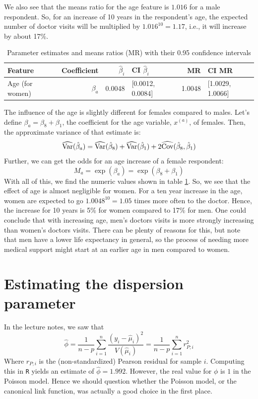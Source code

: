 \documentclass[a4paper,11pt]{article}
\begin{document}
We also see that the means ratio for the age feature is $1.016$ for a male respondent. So, for an increase of 10 years in the respondent's age, the expected number of doctor visits will be multiplied by $1.016^{10} = 1.17$, i.e., it will increase by about 17\%. 

\begin{table}[h]
\centering
\begin{tabular}{|l|r|r|l|r|l|}
\hline
Feature & Coefficient & $\hat{\beta}_i$ & CI $\hat{\beta}_i$ & MR & CI MR\\
\hline
         Age (for women)& $\beta_a $ & 0.0048&[0.0012, 0.0084]& 1.0048 &[1.0029, 1.0066] \\
\hline
 \end{tabular}
 \caption{\label{tab:femal_age}Parameter estimates and means ratios (MR)
             with their 0.95 confidence intervals}
\end{table}

The influence of the age is slightly different for females compared to males. Let's define $\beta_a = \beta_8 + \beta_1$, the coefficient for the age variable, $x^{(a)}$, of females. Then, the approximate variance of that estimate is:
\begin{equation}
\widehat{\mathrm{Var}}(\hat{\beta}_a) = \widehat{\mathrm{Var}}(\hat{\beta}_8) + \widehat{\mathrm{Var}}(\hat{\beta}_1) + 2 \widehat{\mathrm{Cov}}(\hat{\beta}_8, \hat{\beta}_1)
\end{equation}
Further, we can get the odds for an age increase of a female respondent:
\begin{equation}
M_a = \exp(\beta_a) = \exp(\beta_8 + \beta_1)
\end{equation}
With all of this, we find the numeric values shown in table \ref{tab:femal_age}.
So, we see that the effect of age is almost negligible for women. For a ten year increase in the age, women are expected to go $1.0048^{10} = 1.05$ times more often to the doctor. Hence, the increase for 10 years is 5\% for women compared to 17\% for men. One could conclude that with increasing age, men's doctors visits is more strongly increasing than women's doctors visits. There can be plenty of reasons for this, but note that men have a lower life expectancy in general, so the process of needing more medical support might start at an earlier age in men compared to women.

\section{Estimating the dispersion parameter}
In the lecture notes, we saw that 
\begin{equation}
\widehat{\phi} = \frac{1}{n-p} \sum_{i=1}^n \frac{(y_i- \hat{\mu}_i)^2}{V(\hat{\mu}_i)} = \frac{1}{n-p} \sum_{i=1}^n r_{P;i}^2
\end{equation}
Where $r_{P;i}$ is the (non-standardized) Pearson residual for sample $i$. Computing this in \texttt{R} yields an estimate of $\hat{\phi} = 1.992$. However, the real value for $\phi$ is $1$ in the Poisson model. Hence we should question whether the Poisson model, or the canonical link function, was actually a good choice in the first place.  
\end{document}
